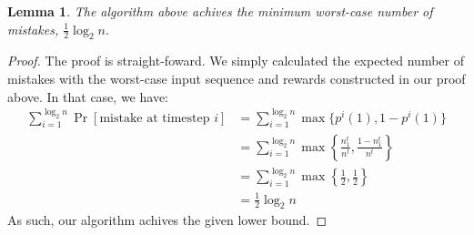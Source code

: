 \documentclass[12pt]{exam}
\newtheorem{lemma}[theorem]{Lemma}
\begin{document}
\begin{questions}
\begin{solution}
\begin{enumerate}[label=(\alph*)]
      \begin{lemma}
        The algorithm above achives the minimum worst-case number of mistakes, $\frac{1}{2} \log_2 n$.
      \end{lemma}
      \begin{proof}
        The proof is straight-foward. We simply calculated the expected number of mistakes with the worst-case input sequence and rewards constructed in our proof above. In that case, we have:
        \begin{align*}
          \sum_{i=1}^{\log_2 n} \Pr[\text{mistake at timestep $i$}] &= \sum_{i=1}^{\log_2 n} \max\{p^i(1), 1 - p^i(1)\} \tag{We have at most $\log_2 n$ tries before the expert set is a singletone} \\
          &= \sum_{i=1}^{\log_2 n} \max\left\{ \frac{n^t_1}{n^t}, \frac{1 - n^t_1}{n^t} \right\} \tag{Using our proposed algorithm} \\
          &= \sum_{i=1}^{\log_2 n} \max\left\{ \frac{1}{2}, \frac{1}{2} \right\} \tag{Using the worst-case sequence of predictions} \\
          &= \frac{1}{2} \log_2 n
        \end{align*}
        As such, our algorithm achives the given lower bound.
      \end{proof}
  \end{enumerate}
\end{solution}



\end{questions}
\end{document}
